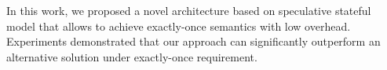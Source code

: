 \label {fs-short-conclusion}

In this work, we proposed a novel architecture based on speculative stateful model that allows to achieve exactly-once semantics with low overhead. Experiments demonstrated that our approach can significantly outperform an alternative solution under exactly-once requirement.